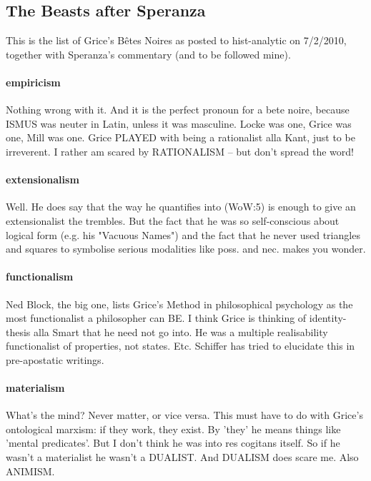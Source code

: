 \documentclass[10pt,titlepage]{book}
\begin{document}
\subsection{The Beasts after Speranza}\label{GriceGripes}

This is the list of Grice's B\^etes Noires as posted to hist-analytic on 7/2/2010, together with Speranza's commentary (and to be followed mine).

\paragraph{empiricism}
Nothing wrong with it. And it is the perfect pronoun for a bete 
 noire, because ISMUS was neuter in Latin, unless it was masculine. Locke 
was  one, Grice was one, Mill was one. Grice PLAYED with being a rationalist 
alla  Kant, just to be irreverent.
I rather am scared by RATIONALISM -- but 
don't  spread the word!
 
\paragraph{extensionalism}
Well. He does say that the way he quantifies into (WoW:5)  
is enough to give an extensionalist the trembles. But the fact that he was 
so  self-conscious about logical form (e.g. his "Vacuous Names") and the fact 
that  he never used triangles and squares to symbolise serious modalities 
like poss.  and nec. makes you wonder.
 
\paragraph{functionalism}
Ned Block, the big one, lists Grice's Method in  
philosophical psychology as the most functionalist a philosopher can BE. I think  Grice 
is thinking of identity-thesis alla Smart that he need not go into. He was  
a multiple realisability functionalist of properties, not states. Etc. 
Schiffer  has tried to elucidate this in pre-apostatic writings.
 
\paragraph{materialism}
What's the mind? Never matter, or vice versa. This must have  
to do with Grice's ontological marxism: if they work, they exist. By 'they' 
he  means things like 'mental predicates'. But I don't think he was into res 
 cogitans itself. So if he wasn't a materialist he wasn't a DUALIST. And 
DUALISM  does scare me. Also ANIMISM.
 
\end{document}
